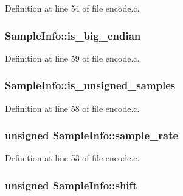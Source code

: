 Definition at line 54 of file encode.\+c.

\subsubsection[{\texorpdfstring{is\+\_\+big\+\_\+endian}{is_big_endian}}]{ Sample\+Info\+::is\+\_\+big\+\_\+endian}\hypertarget{struct_sample_info_a3dce927697c69c2ea0e1212e28a23998}{}\label{struct_sample_info_a3dce927697c69c2ea0e1212e28a23998}


Definition at line 59 of file encode.\+c.

\subsubsection[{\texorpdfstring{is\+\_\+unsigned\+\_\+samples}{is_unsigned_samples}}]{ Sample\+Info\+::is\+\_\+unsigned\+\_\+samples}\hypertarget{struct_sample_info_a54453a38a287382a8cb9da32f00694ae}{}\label{struct_sample_info_a54453a38a287382a8cb9da32f00694ae}


Definition at line 58 of file encode.\+c.

\subsubsection[{\texorpdfstring{sample\+\_\+rate}{sample_rate}}]{\setlength{\rightskip}{0pt plus 5cm}unsigned Sample\+Info\+::sample\+\_\+rate}\hypertarget{struct_sample_info_ad91f85275cc07ecb93546c9bdfe7d9a8}{}\label{struct_sample_info_ad91f85275cc07ecb93546c9bdfe7d9a8}


Definition at line 53 of file encode.\+c.

\subsubsection[{\texorpdfstring{shift}{shift}}]{\setlength{\rightskip}{0pt plus 5cm}unsigned Sample\+Info\+::shift}\hypertarget{struct_sample_info_a1551ef914836533ba597e7789733cfd7}{}\label{struct_sample_info_a1551ef914836533ba597e7789733cfd7}


